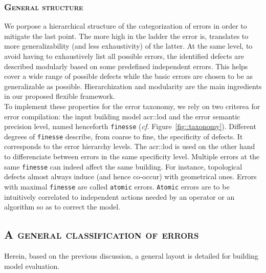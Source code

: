        \subsubsection{\textsc{General structure}}
            We porpose a hierarchical structure of the categorization of errors in order to mitigate the last point.
            The more high in the ladder the error is, translates to more generalizability (and less exhaustivity) of the latter.
            At the same level, to avoid having to exhaustively list all possible errors, the identified defects are described modularly based on some predefined independent errors.
            This helps cover a wide range of possible defects while the basic errors are chosen to be as generalizable as possible.
            Hierarchization and modularity are the main ingredients in our proposed flexible framework.\\

            To implement these properties for the error taxonomy, we rely on two criterea for error compilation: the input building model \gls{acr::lod} and the error semantic precision level, named henceforth \texttt{finesse} (\textit{cf.} Figure~\ref{fig::taxonomy}).
            Different degrees of \texttt{finesse} describe, from coarse to fine, the specificity of defects.
            It corresponds to the error hierarchy levels.
            The \gls{acr::lod} is used on the other hand to differenciate between errors in the same specificity level.
            Multiple errors at the same \texttt{finesse} can indeed affect the same building.
            For instance, topological defects almost always induce (and hence co-occur) with geometrical ones.
            Errors with maximal \texttt{finesse} are called \texttt{atomic} errors.
            \texttt{Atomic} errors are to be intuitively correlated to independent actions needed by an operator or an algorithm so as to correct the model.

    \subsection{\textsc{A general classification of errors}}
        \label{subsec::semantic_evaluation::general_framework::error_classification}
        Herein, based on the previous discussion, a general layout is detailed for building model evaluation.

